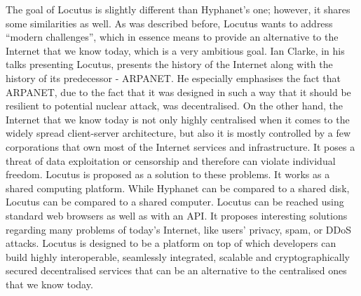 The goal of Locutus \cite{locutus} is slightly different than Hyphanet's one; however, it shares some similarities as well. As was described before, Locutus wants to address “modern challenges”, which in essence means to provide an alternative to the Internet that we know today, which is a very ambitious goal.
Ian Clarke, in his talks presenting Locutus, presents the history of the Internet along with the history of its predecessor - ARPANET. He especially emphasises the fact that ARPANET, due to the fact that it was designed in such a way that it should be resilient to potential nuclear attack, was decentralised. On the other hand, the Internet that we know today is not only highly centralised when it comes to the widely spread client-server architecture, but also it is mostly controlled by a few corporations that own most of the Internet services and infrastructure.
It poses a threat of data exploitation or censorship and therefore can violate individual freedom. Locutus is proposed as a solution to these problems.
It works as a shared computing platform. While Hyphanet can be compared to a shared disk, Locutus can be compared to a shared computer.
Locutus can be reached using standard web browsers as well as with an API. It proposes interesting solutions regarding many problems of today’s Internet, like users' privacy, spam, or DDoS attacks. Locutus is designed to be a platform on top of which developers can build highly interoperable, seamlessly integrated, scalable and cryptographically secured decentralised services that can be an alternative to the centralised ones that we know today.

